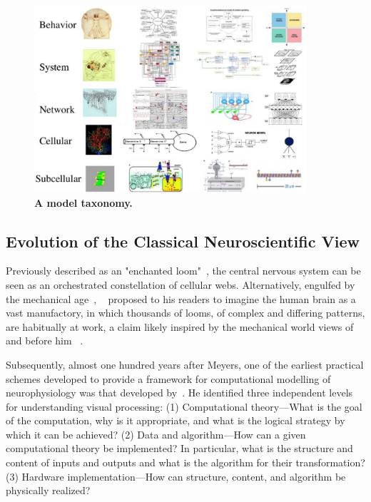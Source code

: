 \documentclass[11pt,3p,twocolumn]{JMN}
\begin{document}

\begin{figure}[h!t]
  \begin{center}
    \includegraphics[width=0.9\textwidth]{figures/multi-scale-taxonomy-no-arrows-no-texts.pdf}
    \caption{ \small{\bf A model taxonomy.} }
  \end{center}
  \label{fig:multi-scale-taxonomy}
\end{figure}

\subsection{Evolution of the Classical Neuroscientific View}

Previously described as an "enchanted loom"~\citep{sherrington53}, the central nervous system can be seen as an orchestrated constellation of cellular webs. Alternatively, engulfed by the mechanical age~\citep{carlyle52}, ~\citet{meyers87} proposed to his readers to imagine the human brain as a vast manufactory, in which thousands of looms, of complex and differing patterns, are habitually at work, a claim likely inspired by the mechanical world views of ~\citet{descartes62} and before him ~\citet[][republished 2003]{fernel67}. 

Subsequently, almost one hundred years after Meyers, one of the earliest practical schemes developed to provide a framework for computational modelling of neurophysiology was that developed by~\citet{Marr:1982fk}. He identified three independent levels for understanding visual processing: (1) Computational theory---What is the goal of the computation, why is it appropriate, and what is the logical strategy by which it can be achieved? (2) Data and algorithm---How can a given computational theory be implemented? In particular, what is the structure and content of inputs and outputs and what is the algorithm for their transformation? (3) Hardware implementation---How can structure, content, and algorithm be physically realized?
\end{document}

